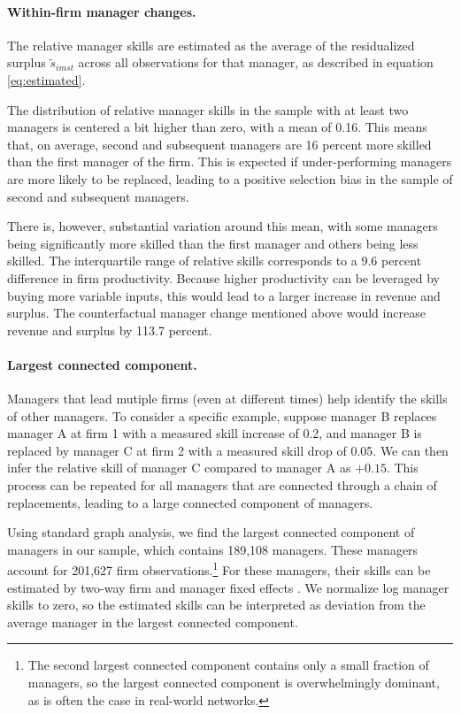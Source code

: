 \documentclass[11pt,a4paper]{article}
\begin{document}


\paragraph{Within-firm manager changes.}




The relative manager skills are estimated as the average of the residualized surplus $\tilde s_{imst}$ across all observations for that manager, as described in equation \eqref{eq:estimated}. 

The distribution of relative manager skills in the sample with at least two managers is centered a bit higher than zero, with a mean of 0.16. This means that, on average, second and subsequent managers are 16 percent more skilled than the first manager of the firm. This is expected if under-performing managers are more likely to be replaced, leading to a positive selection bias in the sample of second and subsequent managers. 

There is, however, substantial variation around this mean, with some managers being significantly more skilled than the first manager and others being less skilled. The interquartile range of relative skills corresponds to a 9.6 percent difference in firm productivity. Because higher productivity can be leveraged by buying more variable inputs, this would lead to a larger increase in revenue and surplus. The counterfactual manager change mentioned above would increase revenue and surplus by 113.7 percent.


\paragraph{Largest connected component.}
Managers that lead mutiple firms (even at different times) help identify the skills of other managers. To consider a specific example, suppose manager B replaces manager A at firm 1 with a measured skill increase of 0.2, and manager B is replaced by manager C at firm 2 with a measured skill drop of 0.05. We can then infer the relative skill of manager C compared to manager A as $+0.15$. This process can be repeated for all managers that are connected through a chain of replacements, leading to a large connected component of managers.

Using standard graph analysis, we find the largest connected component of managers in our sample, which contains 189,108 managers. These managers account for 201,627 firm observations.\footnote{The second largest connected component contains only a small fraction of managers, so the largest connected component is overwhelmingly dominant, as is often the case in real-world networks.} For these managers, their skills can be estimated by two-way firm and manager fixed effects \citep{Abowd1999Econometrica,reghdfe}. We normalize log manager skills to zero, so the estimated skills can be interpreted as deviation from the average manager in the largest connected component. 
\end{document}
